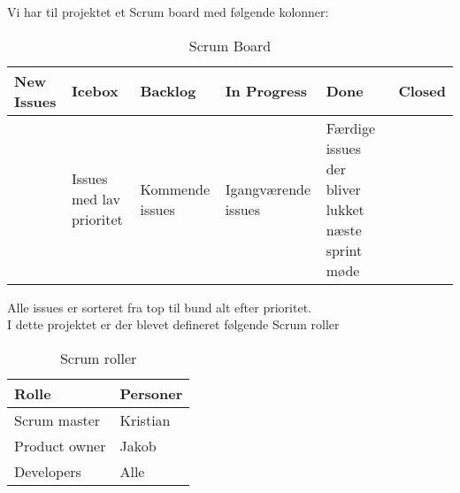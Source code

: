 \noindent
Vi har til projektet et Scrum board med følgende kolonner:

\begin{table}[ht]
    \begin{tabularx}{\textwidth}{|X|X|X|X|X|X|}
    \hline
    \textbf{New Issues} & \textbf{Icebox} & \textbf{Backlog} & \textbf{In Progress} & \textbf{Done} & \textbf{Closed} \\ \hline
     & Issues med lav prioritet & Kommende issues & Igangværende issues & Færdige issues der bliver lukket næste sprint møde & \\ \hline
    \end{tabularx}
    \caption{Scrum Board}
    \label{tab:scrumboard}
\end{table} 

\noindent
Alle issues er sorteret fra top til bund alt efter prioritet. \\


\noindent
I dette projektet er der blevet defineret følgende Scrum roller \\

\noindent
\begin{table}[h]
    \centering
    \begin{tabular}[h]{|p{3cm}|p{3cm}|}
        \hline
        \textbf{Rolle} & \textbf{Personer} \\
        \hline
        Scrum master & Kristian \\
        \hline
        Product owner & Jakob \\
        \hline
        Developers & Alle \\
        \hline
    \end{tabular}
    \caption{Scrum roller}
    \label{tab:Scrum_roles}
\end{table}



